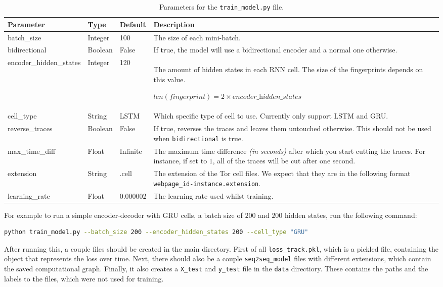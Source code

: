 \begin{table}[ht]
  \centering
  \begin{tabular}{ l | l | l | p{} }
    \textbf{Parameter} & \textbf{Type} & \textbf{Default} & \textbf{Description} \\ \hline \hline
    batch\_size & Integer & 100 & The size of each mini-batch. \\ \hline
    bidirectional & Boolean & False & If true, the model will use a bidirectional encoder and a normal one otherwise. \\ \hline
    encoder\_hidden\_states & Integer & 120 & The amount of hidden states in each RNN cell. The size of the fingerprints depends on this value. \par $\textit{len}(\textit{fingerprint}) = 2 \times \textit{encoder\_hidden\_states}$ \\ \hline
    cell\_type & String & LSTM & Which specific type of cell to use. Currently only support LSTM and GRU. \\ \hline
    reverse\_traces & Boolean & False & If true, reverses the traces and leaves them untouched otherwise. This should not be used when \texttt{bidirectional} is true. \\ \hline
    max\_time\_diff & Float & Infinite & The maximum time difference \textit{(in seconds)} after which you start cutting the traces. For instance, if set to $1$, all of the traces will be cut after one second.\\ \hline
    extension & String & .cell & The extension of the Tor cell files. We expect that they are in the following format \texttt{webpage\_id-instance.extension}. \\ \hline
    learning\_rate & Float & 0.000002 & The learning rate used whilst training.
  \end{tabular}
  \caption{Parameters for the \texttt{train\_model.py} file.}
\end{table}

\newpage

\noindent
For example to run a simple encoder-decoder with GRU cells, a batch size of $200$ and $200$ hidden states, run the following command:
\begin{lstlisting}[language=Bash]
python train_model.py --batch_size 200 --encoder_hidden_states 200 --cell_type "GRU"
\end{lstlisting}

After running this, a couple files should be created in the main directory.
First of all \texttt{loss\_track.pkl}, which is a pickled file, containing the object that represents the loss over time.
Next, there should also be a couple \texttt{seq2seq\_model} files with different extensions, which contain the saved computational graph.
Finally, it also creates a \texttt{X\_test} and \texttt{y\_test} file in the \texttt{data} directiory.
These contains the paths and the labels to the files, which were not used for training.

